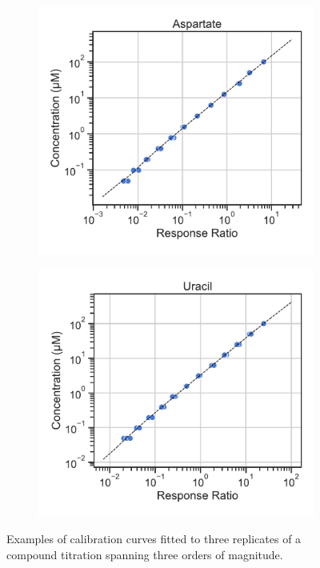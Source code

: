 \begin{figure}[ht]
     \centering
     \begin{subfigure}[b]{0.4\textwidth}
         \includegraphics[width=\textwidth]{figures/chap2/app/calibration_curve_asp.pdf}
     \end{subfigure}
     \hspace{0.035\textwidth}
     \begin{subfigure}[b]{0.4\textwidth}
         \includegraphics[width=\textwidth]{figures/chap2/app/calibration_curve_uracil.pdf}
     \end{subfigure}
        \caption[Isotope dilution calibration curves.]{
        Examples of calibration curves fitted to three replicates of a compound titration spanning three orders of magnitude.
        }
        \label{fig:app_ch2:calibration_curve}
\end{figure}












